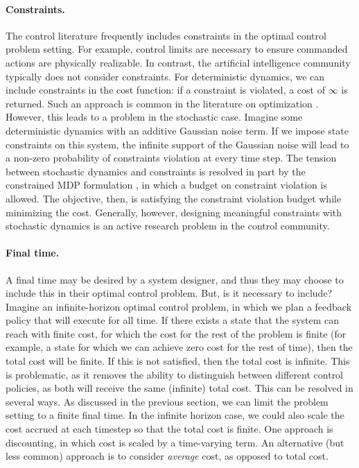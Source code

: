 \paragraph{Constraints.} The control literature frequently includes constraints in the optimal control problem setting. For example, control limits are necessary to ensure commanded actions are physically realizable. In contrast, the artificial intelligence community typically does not consider constraints. For deterministic dynamics, we can include constraints in the cost function: if a constraint is violated, a cost of $\infty$ is returned. Such an approach is common in the literature on optimization \cite{boyd2004convex}. However, this leads to a problem in the stochastic case. Imagine some deterministic dynamics with an additive Gaussian noise term. If we impose state constraints on this system, the infinite support of the Gaussian noise will lead to a non-zero probability of constraints violation at every time step. The tension between stochastic dynamics and constraints is resolved in part by the constrained MDP formulation \cite{altman1999constrained}, in which a budget on constraint violation is allowed. The objective, then, is satisfying the constraint violation budget while minimizing the cost. Generally, however, designing meaningful constraints with stochastic dynamics is an active research problem in the control community. 

\paragraph{Final time.} A final time may be desired by a system designer, and thus they may choose to include this in their optimal control problem. But, is it necessary to include? Imagine an infinite-horizon optimal control problem, in which we plan a feedback policy that will execute for all time. If there exists a state that the system can reach with finite cost, for which the cost for the rest of the problem is finite (for example, a state for which we can achieve zero cost for the rest of time), then the total cost will be finite. If this is not satisfied, then the total cost is infinite. This is problematic, as it removes the ability to distinguish between different control policies, as both will receive the same (infinite) total cost. This can be resolved in several ways. As discussed in the previous section, we can limit the problem setting to a finite final time. In the infinite horizon case, we could also scale the cost accrued at each timestep so that the total cost is finite. One approach is discounting, in which cost is scaled by a time-varying term. An alternative (but less common) approach is to consider \textit{average} cost, as opposed to total cost. 


